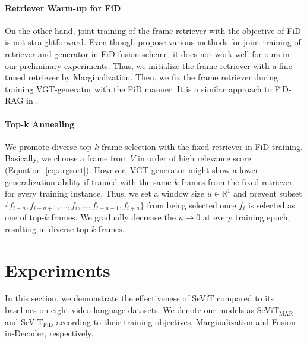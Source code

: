\documentclass{article}
\newcommand{\frameworkname}{SeViT}
\begin{document}
\paragraph{Retriever Warm-up for FiD}

On the other hand, joint training of the frame retriever with the objective of FiD is not straightforward. Even though \citet{izacard2022few} propose various methods for joint training of retriever and generator in FiD fusion scheme, it does not work well for ours in our preliminary experiments. Thus, we initialize the frame retriever with a fine-tuned retriever by Marginalization. Then, we fix the frame retriever during training VGT-generator with the FiD manner. It is a similar approach to FiD-RAG in \citet{shuster2021retrieval}.


\paragraph{Top-k Annealing}

We promote diverse top-$k$ frame selection with the fixed retriever in FiD training. Basically, we choose a frame from $V$ in order of high relevance score (Equation~\ref{eq:argsort}). However, VGT-generator might show a lower generalization ability if trained with the same $k$ frames from the fixed retriever for every training instance. Thus, we set a window size $u \in \mathbb{R}^1$ and prevent subset $\{f_{i-u}, f_{i-u+1}, ..., f_i, ..., f_{i+u-1}, f_{i+u}\}$ from being selected once $f_i$ is selected as one of top-$k$ frames. We gradually decrease the $u \rightarrow 0$ at every training epoch, resulting in diverse top-$k$ frames.

 \section{Experiments}

In this section, we demonstrate the effectiveness of \frameworkname{} compared to its baselines on eight video-language datasets. We denote our models as \frameworkname{}$_\text{MAR}$ and \frameworkname{}$_\text{FiD}$ according to their training objectives, Marginalization and Fusion-in-Decoder, respectively. 
\end{document}

